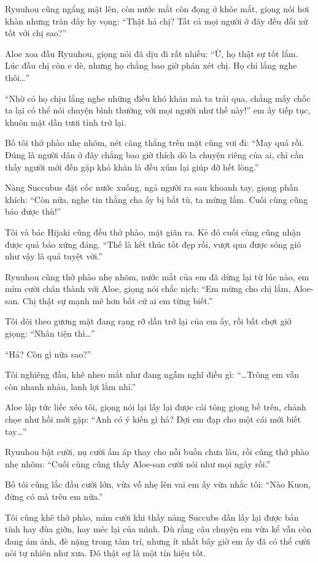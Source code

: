 \documentclass[../main.tex]{subfiles}
\begin{document}
Ryuuhou cũng ngẩng mặt lên, còn nước mắt còn đọng ở khóe mắt, giọng nói hơi khàn nhưng tràn đầy hy vọng: ``Thật hả chị? Tất cả mọi người ở đây đều đối xử tốt với chị sao?''

Aloe xoa đầu Ryuuhou, giọng nói đã dịu đi rất nhiều: ``Ừ, họ thật sự tốt lắm. Lúc đầu chị còn e dè, nhưng họ chẳng bao giờ phán xét chị. Họ chỉ lắng nghe thôi\dots''

``Nhờ có họ chịu lắng nghe những điều khó khăn mà ta trải qua, chẳng mấy chốc ta lại có thể nói chuyện bình thường với mọi người như thế này!'' em ấy tiếp tục, khuôn mặt dần tươi tỉnh trở lại.

Bố tôi thở phào nhẹ nhõm, nét căng thẳng trên mặt cũng vơi đi: ``May quá rồi. Đúng là người dân ở đây chẳng bao giờ thích dò la chuyện riêng của ai, chỉ cần thấy người mới đến gặp khó khăn là đều xúm lại giúp đỡ hết lòng.''

Nàng Succubus đặt cốc nước xuống, ngả người ra sau khoanh tay, giọng phấn khích: ``Còn nữa, nghe tin thằng cha ấy bị bắt tù, ta mừng lắm. Cuối cùng cũng báo được thù!''

Tôi và bác Hijaki cũng đều thở phào, mặt giãn ra. Kẻ đó cuối cùng cũng nhận được quả báo xứng đáng. ``Thế là kết thúc tốt đẹp rồi, vượt qua được sóng gió như vậy là quá tuyệt vời.''

Ryuuhou cũng thở phào nhẹ nhõm, nước mắt của em đã dừng lại từ lúc nào, em mỉm cười chân thành với Aloe, giọng nói chắc nịch: ``Em mừng cho chị lắm, Aloe-san. Chị thật sự mạnh mẽ hơn bất cứ ai em từng biết.''

Tôi dõi theo gương mặt đang rạng rỡ dần trở lại của em ấy, rồi bất chợt giở giọng: ``Nhân tiện thì\dots''

``Hả? Còn gì nữa sao?''

Tôi nghiêng đầu, khẽ nheo mắt như đang ngẫm nghĩ điều gì: ``\dots Trông em vẫn còn nhanh nhảu, lanh lợi lắm nhỉ.''

Aloe lập tức liếc xéo tôi, giọng nói lại lấy lại được cái tông giọng bề trên, chảnh chọe như hồi mới gặp: ``Anh có ý kiến gì hả? Đợi em đạp cho một cái mới biết tay\dots''

Ryuuhou bật cười, nụ cười ấm áp thay cho nỗi buồn chưa lâu, rồi cũng thở phào nhẹ nhõm: ``Cuối cùng cũng thấy Aloe-san cười nói như mọi ngày rồi.''

Bố tôi cũng lắc đầu cười lớn, vừa vỗ nhẹ lên vai em ấy vừa nhắc tôi: ``Nào Kuon, đừng có mà trêu em nữa.''

Tôi cũng khẽ thở phào, mỉm cười khi thấy nàng Succubs dần lấy lại được bản tính hay đùa giỡn, hay méc lại của mình. Dù rằng câu chuyện em vừa kể vẫn còn đang ám ảnh, đè nặng trong tâm trí, nhưng ít nhất bây giờ em ấy đã có thể cười nói tự nhiên như xưa. Đó thật sự là một tín hiệu tốt.
\end{document}
